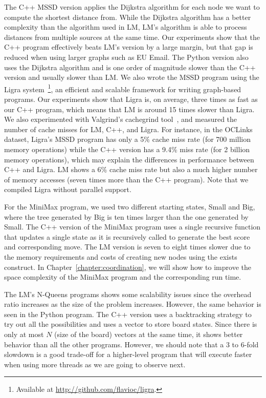 The C++ MSSD version applies the Dijkstra algorithm for each node we want to
compute the shortest distance from. While the Dijkstra algorithm has a better
complexity than the algorithm used in LM, LM's algorithm is able to process
distances from multiple sources at the same time. Our experiments show that the
C++ program effectively beats LM's version by a large margin, but that gap is
reduced when using larger graphs such as EU Email. The Python version also uses
the Dijkstra algorithm and is one order of magnitude slower than the C++ version
and usually slower than LM. We also wrote the MSSD program using the Ligra
system~\cite{Shun:2013:LLG:2517327.2442530}\footnote{Available at
   \url{http://github.com/flavioc/ligra}.}, an efficient and scalable framework
   for writing graph-based programs. Our experiments show that Ligra is, on
   average, three times as fast as our C++ program, which means that LM is
   around 15 times slower than Ligra. We also experimented with Valgrind's
   cachegrind tool~\cite{Nethercote:2007}, and measured the number of cache
   misses for LM, C++, and Ligra.  For instance, in the OCLinks dataset, Ligra's
   MSSD program has only a 5\% cache miss rate (for 700 million memory
   operations) while the C++ version has a 9.4\% miss rate (for 2 billion memory
   operations), which may explain the differences in performance between C++ and
   Ligra.  LM shows a 6\% cache miss rate but also a much higher number of
   memory accesses (seven times more than the C++ program).  Note that we
   compiled Ligra without parallel support.

For the MiniMax program, we used two different starting states, Small and Big,
where the tree generated by Big is ten times larger than the one generated by
Small. The C++ version of the MiniMax program uses a single recursive function
that updates a single state as it is recursively called to generate the best
score and corresponding move. The LM version is seven to eight times slower due
to the memory requirements and costs of creating new nodes using the exists
construct. In Chapter~\ref{chapter:coordination}, we will show how to improve
the space complexity of the MiniMax program and the corresponding run time.

The LM's N-Queens programs shows some scalability issues since the overhead
ratio increases as the size of the problem increases. However, the same behavior
is seen in the Python program. The C++ version uses a backtracking strategy to
try out all the possibilities and uses a vector to store board states.  Since
there is only at most $N$ (size of the board) vectors at the same time, it shows
better behavior than all the other programs. However, we should note that a 3 to
6-fold slowdown is a good trade-off for a higher-level program that will execute
faster when using more threads as we are going to observe next.

